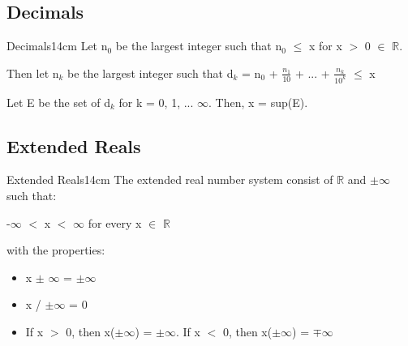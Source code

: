 	\vspace{0.5cm}




	
\subsection{ Decimals }

	\begin{definition}{Decimals}{14cm}
		Let n$_0$ be the largest integer such that n$_0$ $\leq$ x for
		x $>$ 0 $\in$ $\mathbb{R}$.

		Then let n$_k$ be the largest integer such that
		d$_k$ = n$_0$ + $\frac{n_1}{10}$ + ... + $\frac{n_k}{10^k}$ $\leq$ x

		Let E be the set of d$_k$ for k = 0, 1, ... $\infty$. Then, x = sup(E).	
	\end{definition}

	\vspace{0.5cm}





\subsection{ Extended Reals }

	\begin{definition}{Extended Reals}{14cm}
		The extended real number system consist of $\mathbb{R}$
		and $\pm$$\infty$ such that:

		\hspace{1cm}
		-$\infty$ $<$ x $<$ $\infty$ \hspace{1cm} for every x $\in$ $\mathbb{R}$

		with the properties:
		\begin{itemize}[leftmargin=1cm, itemsep=0.1cm]
			\item x $\pm$ $\infty$ = $\pm$$\infty$
		
			\item x / $\pm$$\infty$ = 0

			\item If x $>$ 0, then x($\pm$$\infty$) = $\pm$$\infty$.
				If x $<$ 0, then x($\pm$$\infty$) = $\mp$$\infty$
		\end{itemize}	
	\end{definition}

	\vspace{0.5cm}





